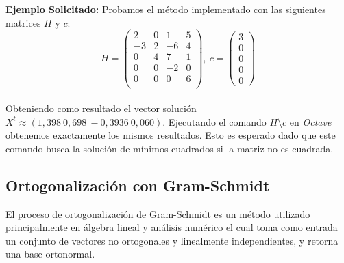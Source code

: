 \documentclass{endm}
\begin{document}
\textbf{Ejemplo Solicitado:} Probamos el método implementado con las siguientes matrices $H$ y $c$:
\begin{equation*}
    H = \begin{pmatrix}
        2 & 0 & 1 & 5\\
        -3 & 2 & -6 & 4\\
        0 & 4 & 7 & 1\\
        0 & 0 & -2 & 0\\
        0 & 0 & 0 & 6\\
    \end{pmatrix}, \
    c = \begin{pmatrix}
        3\\
        0\\
        0\\
        0\\
        0
    \end{pmatrix}
\end{equation*}\\
Obteniendo como resultado el vector solución $X^t \approx (1,398 \ 0,698 \ -0,3936 \ 0,060)$. Ejecutando el comando $H \setminus c$ en \textit{Octave} obtenemos exactamente los mismos resultados. Esto es esperado dado que este comando busca la solución de mínimos cuadrados si la matriz no es cuadrada\cite{octavelinalg}.

\subsection{Ortogonalizaci\'on con Gram-Schmidt} \label{ortgs}

El proceso de ortogonalizaci\'on de Gram-Schmidt es un m\'etodo utilizado principalmente en \'algebra lineal y an\'alisis num\'erico el cual toma como entrada un conjunto de vectores no ortogonales y linealmente independientes, y retorna una base ortonormal.\\
\end{document}
